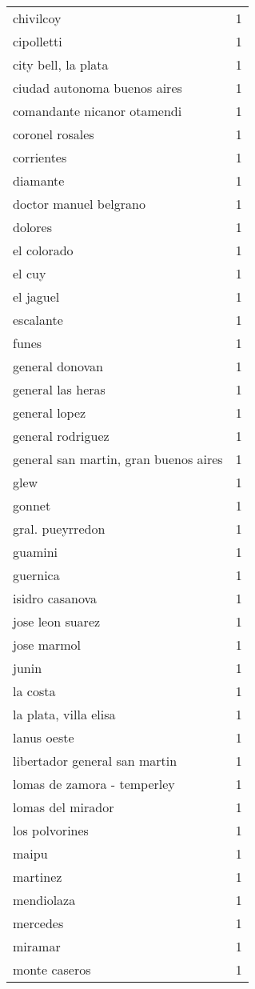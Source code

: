 \documentclass[
]{article}
\begin{document}
\begin{longtable}[t]{lr}
chivilcoy & 1\\
cipolletti & 1\\
\addlinespace
city bell, la plata & 1\\
ciudad autonoma buenos aires & 1\\
comandante nicanor otamendi & 1\\
coronel rosales & 1\\
corrientes & 1\\
\addlinespace
diamante & 1\\
doctor manuel belgrano & 1\\
dolores & 1\\
el colorado & 1\\
el cuy & 1\\
\addlinespace
el jaguel & 1\\
escalante & 1\\
funes & 1\\
general donovan & 1\\
general las heras & 1\\
\addlinespace
general lopez & 1\\
general rodriguez & 1\\
general san martin, gran buenos aires & 1\\
glew & 1\\
gonnet & 1\\
\addlinespace
gral. pueyrredon & 1\\
guamini & 1\\
guernica & 1\\
isidro casanova & 1\\
jose leon suarez & 1\\
\addlinespace
jose marmol & 1\\
junin & 1\\
la costa & 1\\
la plata, villa elisa & 1\\
lanus oeste & 1\\
\addlinespace
libertador general san martin & 1\\
lomas de zamora - temperley & 1\\
lomas del mirador & 1\\
los polvorines & 1\\
maipu & 1\\
\addlinespace
martinez & 1\\
mendiolaza & 1\\
mercedes & 1\\
miramar & 1\\
monte caseros & 1\\

\end{longtable}
\end{document}
